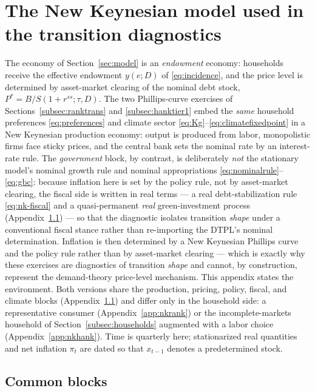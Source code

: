 \documentclass[12pt]{article}
\newcommand{\Sfun}{S}
\begin{document}
\section{The New Keynesian model used in the transition
diagnostics}\label{app:nkmodel}

The economy of Section~\ref{sec:model} is an \emph{endowment} economy:
households receive the effective endowment $y(e;D)$ of
\eqref{eq:incidence}, and the price level is determined by asset-market
clearing of the nominal debt stock, $P^\ast=B/\Sfun(1+r^{ss};\tau,D)$. The
two Phillips-curve exercises of Sections~\ref{subsec:ranktrans} and
\ref{subsec:hanktier1} embed the \emph{same} household preferences
\eqref{eq:preferences} and climate sector
\eqref{eq:Kg}--\eqref{eq:climatefixedpoint} in a New Keynesian production
economy: output is produced from labor, monopolistic firms face sticky
prices, and the central bank sets the nominal rate by an interest-rate
rule. The \emph{government} block, by contrast, is deliberately \emph{not}
the stationary model's nominal growth rule and nominal appropriations
\eqref{eq:nominalrule}--\eqref{eq:gbc}: because inflation here is set by the
policy rule, not by asset-market clearing, the fiscal side is written in real
terms --- a real debt-stabilization rule \eqref{eq:nk-fiscal} and a
quasi-permanent \emph{real} green-investment process (Appendix~\ref{app:nkcommon})
--- so that the diagnostic isolates transition \emph{shape} under a
conventional fiscal stance rather than re-importing the DTPL's nominal
determination. Inflation is then determined by a New Keynesian Phillips curve and
the policy rule rather than by asset-market clearing --- which is exactly
why these exercises are diagnostics of transition \emph{shape} and cannot,
by construction, represent the demand-theory price-level mechanism. This
appendix states the environment. Both versions share the production,
pricing, policy, fiscal, and climate blocks (Appendix~\ref{app:nkcommon})
and differ only in the household side: a representative consumer
(Appendix~\ref{app:nkrank}) or the incomplete-markets household of
Section~\ref{subsec:households} augmented with a labor choice
(Appendix~\ref{app:nkhank}). Time is quarterly here; stationarized
real quantities and net inflation $\pi_t$ are dated so that $x_{t-1}$
denotes a predetermined stock.

\subsection{Common blocks}\label{app:nkcommon}
\end{document}
